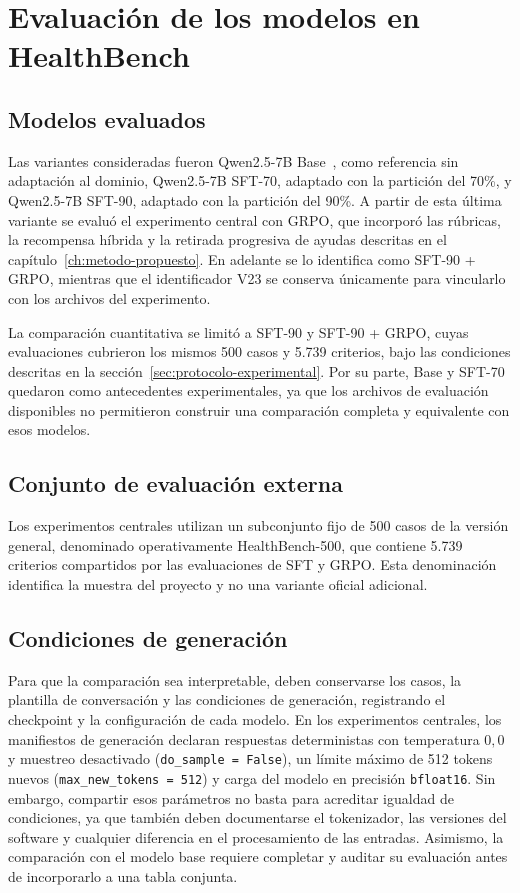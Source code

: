 \section{Evaluación de los modelos en HealthBench}
\label{sec:evaluacion-healthbench}
\label{sec:protocolo-experimental}
\label{sec:evaluacion-protocolo}
\subsection{Modelos evaluados}
Las variantes consideradas fueron Qwen2.5-7B Base~\cite{qwen2024qwen25}, como referencia sin adaptación al dominio, Qwen2.5-7B SFT-70, adaptado con la partición del 70\%, y Qwen2.5-7B SFT-90, adaptado con la partición del 90\%. A partir de esta última variante se evaluó el experimento central con GRPO, que incorporó las rúbricas, la recompensa híbrida y la retirada progresiva de ayudas descritas en el capítulo~\ref{ch:metodo-propuesto}. En adelante se lo identifica como SFT-90 + GRPO, mientras que el identificador V23 se conserva únicamente para vincularlo con los archivos del experimento.

La comparación cuantitativa se limitó a SFT-90 y SFT-90 + GRPO, cuyas evaluaciones cubrieron los mismos 500 casos y 5.739 criterios, bajo las condiciones descritas en la sección~\ref{sec:protocolo-experimental}. Por su parte, Base y SFT-70 quedaron como antecedentes experimentales, ya que los archivos de evaluación disponibles no permitieron construir una comparación completa y equivalente con esos modelos.

\subsection{Conjunto de evaluación externa}
Los experimentos centrales utilizan un subconjunto fijo de 500 casos de la versión general, denominado operativamente HealthBench-500, que contiene 5.739 criterios compartidos por las evaluaciones de SFT y GRPO. Esta denominación identifica la muestra del proyecto y no una variante oficial adicional.

\subsection{Condiciones de generación}
Para que la comparación sea interpretable, deben conservarse los casos, la plantilla de conversación y las condiciones de generación, registrando el checkpoint y la configuración de cada modelo. En los experimentos centrales, los manifiestos de generación declaran respuestas deterministas con temperatura $0{,}0$ y muestreo desactivado (\texttt{do\_sample = False}), un límite máximo de 512 tokens nuevos (\texttt{max\_new\_tokens = 512}) y carga del modelo en precisión \texttt{bfloat16}. Sin embargo, compartir esos parámetros no basta para acreditar igualdad de condiciones, ya que también deben documentarse el tokenizador, las versiones del software y cualquier diferencia en el procesamiento de las entradas. Asimismo, la comparación con el modelo base requiere completar y auditar su evaluación antes de incorporarlo a una tabla conjunta.

